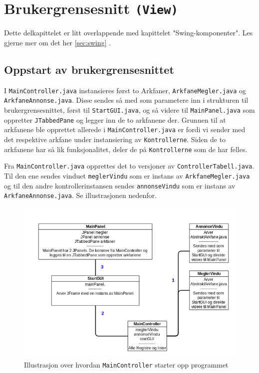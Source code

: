 \section{Brukergrensesnitt \texttt{(View)}} \label{sec:brukergrensesnitt}

Dette delkapittelet er litt overlappende med kapittelet "Swing-komponenter". Les gjerne mer om det her \ref{sec:swing} \pageref{sec:swing}.

\subsection{Oppstart av brukergrensesnittet}
I \texttt{MainController.java} instansieres først to Arkfaner, \texttt{ArkfaneMegler.java} og \texttt{ArkfaneAnnonse.java}.
Disse sendes så med som parametere inn i strukturen til brukergrensesnittet, først til \texttt{StartGUI.java}, og så videre til \texttt{MainPanel.java} som oppretter \texttt{JTabbedPane} og legger inn de to arkfanene der.
Grunnen til at arkfanene ble opprettet allerede i \texttt{MainController.java} er fordi vi sender med det respektive arkfane under instansiering av \texttt{Kontrollerne}. 
Siden de to arkfanene har så lik funksjonalitet, deler de på \texttt{Kontrollerne} som de har felles.

Fra \texttt{MainController.java} opprettes det to versjoner av \texttt{ControllerTabell.java}. Til den ene sendes vinduet \texttt{meglerVindu} som er instans av \texttt{ArkfaneMegler.java} og til den andre kontrollerinstansen sendes \texttt{annonseVindu} som er instans av \texttt{ArkfaneAnnonse.java}.
Se illustrasjonen nedenfor.
\begin{figure}[ht]
\includegraphics[width=\textwidth,height=\textheight,keepaspectratio]{./img/produktdokumentasjon/bilder/Controller_og_GUI-opprettelse2.png}
\caption{Illustrasjon over hvordan \texttt{MainController} starter opp programmet}
\end{figure}


